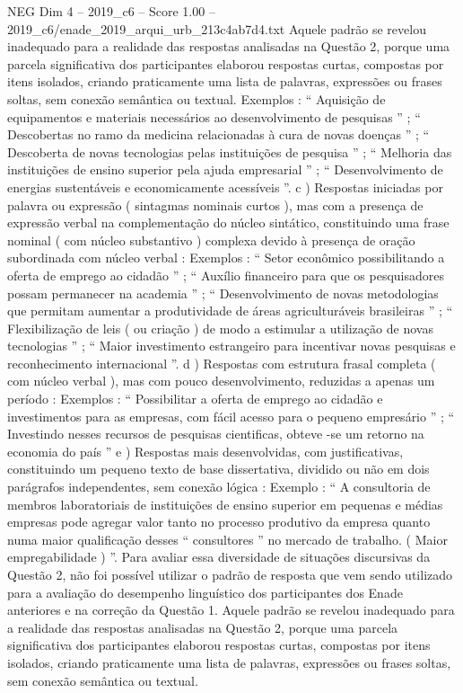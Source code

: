 \begin{textsample}{NEG Dim 4 – 2019\_c6 – Score 1.00 – 2019\_c6/enade\_2019\_arqui\_urb\_213c4ab7d4.txt}
Aquele padrão se revelou inadequado para a realidade das respostas analisadas na Questão 2, porque uma parcela significativa dos participantes elaborou respostas curtas, compostas por itens isolados, criando praticamente uma lista de palavras, expressões ou frases soltas, sem conexão semântica ou textual.
Exemplos : “ Aquisição de equipamentos e materiais necessários ao desenvolvimento de pesquisas ” ; “ Descobertas no ramo da medicina relacionadas à cura de novas doenças ” ; “ Descoberta de novas tecnologias pelas instituições de pesquisa ” ; “ Melhoria das instituições de ensino superior pela ajuda empresarial ” ; “ Desenvolvimento de energias sustentáveis e economicamente acessíveis ”. c ) Respostas iniciadas por palavra ou expressão ( sintagmas nominais curtos ), mas com a presença de expressão verbal na complementação do núcleo sintático, constituindo uma frase nominal ( com núcleo substantivo ) complexa devido à presença de oração subordinada com núcleo verbal : Exemplos : “ Setor econômico possibilitando a oferta de emprego ao cidadão ” ; “ Auxílio financeiro para que os pesquisadores possam permanecer na academia ” ; “ Desenvolvimento de novas metodologias que permitam aumentar a produtividade de áreas agriculturáveis brasileiras ” ; “ Flexibilização de leis ( ou criação ) de modo a estimular a utilização de novas tecnologias ” ; “ Maior investimento estrangeiro para incentivar novas pesquisas e reconhecimento internacional ”. d ) Respostas com estrutura frasal completa ( com núcleo verbal ), mas com pouco desenvolvimento, reduzidas a apenas um período : Exemplos : “ Possibilitar a oferta de emprego ao cidadão e investimentos para as empresas, com fácil acesso para o pequeno empresário ” ; “ Investindo nesses recursos de pesquisas cientificas, obteve -se um retorno na economia do país ” e ) Respostas mais desenvolvidas, com justificativas, constituindo um pequeno texto de base dissertativa, dividido ou não em dois parágrafos independentes, sem conexão lógica : Exemplo : “ A consultoria de membros laboratoriais de instituições de ensino superior em pequenas e médias empresas pode agregar valor tanto no processo produtivo da empresa quanto numa maior qualificação desses “ consultores ” no mercado de trabalho. ( Maior empregabilidade ) ”.
Para avaliar essa diversidade de situações discursivas da Questão 2, não foi possível utilizar o padrão de resposta que vem sendo utilizado para a avaliação do desempenho linguístico dos participantes dos Enade anteriores e na correção da Questão 1.
Aquele padrão se revelou inadequado para a realidade das respostas analisadas na Questão 2, porque uma parcela significativa dos participantes elaborou respostas curtas, compostas por itens isolados, criando praticamente uma lista de palavras, expressões ou frases soltas, sem conexão semântica ou textual.

\end{textsample}
